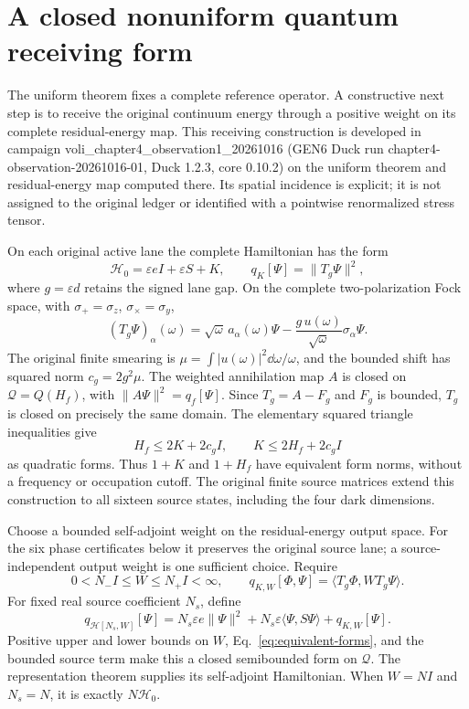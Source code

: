 \section{A closed nonuniform quantum receiving form}\label{sec:nonuniform}
The uniform theorem fixes a complete reference operator. A constructive next step is to receive the original continuum energy through a positive weight on its complete residual-energy map. This receiving construction is developed in campaign voli\_chapter4\_observation1\_20261016 (GEN6 Duck run chapter4-observation-20261016-01, Duck 1.2.3, core 0.10.2) on the uniform theorem and residual-energy map computed there. Its spatial incidence is explicit; it is not assigned to the original ledger or identified with a pointwise renormalized stress tensor.

On each original active lane the complete Hamiltonian has the form
\[
 \mathcal H_0=\varepsilon eI+\varepsilon S+K,\qquad
 q_K[\Psi]=\|T_g\Psi\|^2,
\]
where $g=\varepsilon d$ retains the signed lane gap. On the complete two-polarization Fock space, with $\sigma_+=\sigma_z$, $\sigma_\times=\sigma_y$,
\[
 (T_g\Psi)_\alpha(\omega)=\sqrt\omega\,a_\alpha(\omega)\Psi
 -\frac{g\,u(\omega)}{\sqrt\omega}\sigma_\alpha\Psi.
\]
The original finite smearing is $\mu=\int|u(\omega)|^2\dd\omega/\omega$, and the bounded shift has squared norm $c_g=2g^2\mu$. The weighted annihilation map $A$ is closed on $\mathcal Q=Q(H_f)$, with $\|A\Psi\|^2=q_f[\Psi]$. Since $T_g=A-F_g$ and $F_g$ is bounded, $T_g$ is closed on precisely the same domain. The elementary squared triangle inequalities give
\begin{equation}
 H_f\le2K+2c_gI,\qquad K\le2H_f+2c_gI
 \label{eq:equivalent-forms}
\end{equation}
as quadratic forms. Thus $1+K$ and $1+H_f$ have equivalent form norms, without a frequency or occupation cutoff. The original finite source matrices extend this construction to all sixteen source states, including the four dark dimensions.

Choose a bounded self-adjoint weight on the residual-energy output space. For the six phase certificates below it preserves the original source lane; a source-independent output weight is one sufficient choice. Require
\[
 0<N_-I\le W\le N_+I<\infty,
 \qquad q_{K,W}[\Phi,\Psi]=\langle T_g\Phi,WT_g\Psi\rangle.
\]
For fixed real source coefficient $N_s$, define
\[
 q_{\mathcal H[N_s,W]}[\Psi]
 =N_s\varepsilon e\|\Psi\|^2+N_s\varepsilon\langle\Psi,S\Psi\rangle
 +q_{K,W}[\Psi].
\]
Positive upper and lower bounds on $W$, Eq.~\eqref{eq:equivalent-forms}, and the bounded source term make this a closed semibounded form on $\mathcal Q$. The representation theorem supplies its self-adjoint Hamiltonian. When $W=NI$ and $N_s=N$, it is exactly $N\mathcal H_0$.

